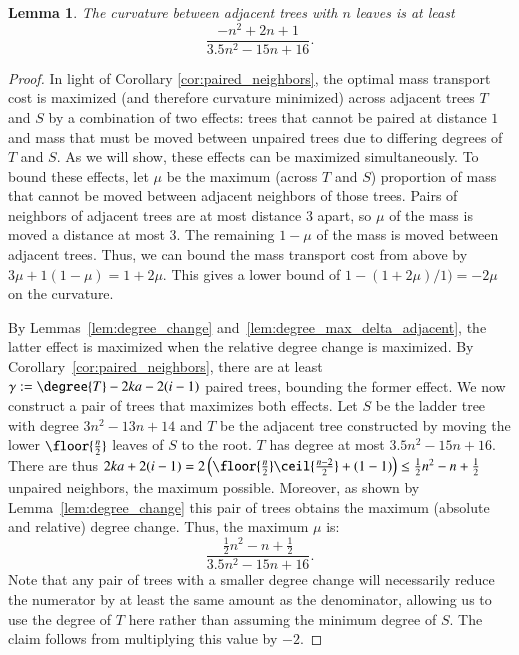 \documentclass[]{elsarticle}
\newtheorem{lem}[thm]{Lemma}
\newcommand{\overlap}{%
	\gamma
}
\begin{document}
\begin{lem}
\label{lem:curvature_lower_bound}
	The curvature between adjacent trees with $n$ leaves is at least
	$$\frac{-n^2 + 2n + 1}{3.5n^2 - 15n + 16}.$$
\end{lem}
\begin{proof}
    In light of Corollary \ref{cor:paired_neighbors}, the optimal mass transport cost is maximized (and therefore curvature minimized) across adjacent trees $T$ and $S$ by a combination of two effects: trees that cannot be paired at distance $1$ and mass that must be moved between unpaired trees due to differing degrees of $T$ and $S$.
		As we will show, these effects can be maximized simultaneously.
    To bound these effects, let $\mu$ be the maximum (across $T$ and $S$) proportion of mass that cannot be moved between adjacent neighbors of those trees.
		Pairs of neighbors of adjacent trees are at most distance 3 apart, so $\mu$ of the mass is moved a distance at most 3.
		The remaining $1-\mu$ of the mass is moved between adjacent trees.
		Thus, we can bound the mass transport cost from above by $3\mu + 1(1-\mu) = 1 + 2\mu$.
	This gives a lower bound of $1 - (1 + 2\mu) / 1) = -2\mu$ on the curvature.

	By Lemmas~\ref{lem:degree_change} and~\ref{lem:degree_max_delta_adjacent}, the latter effect is maximized when the relative degree change is maximized.
	By Corollary~\ref{cor:paired_neighbors}, there are at least $\overlap := \degree{T} -2ka - 2(i-1)$ paired trees, bounding the former effect.
	We now construct a pair of trees that maximizes both effects.
	Let $S$ be the ladder tree with degree $3n^2 - 13n + 14$ and $T$ be the adjacent tree constructed by moving the lower $\floor{\frac{n}{2}}$ leaves of $S$ to the root.
	$T$ has degree at most $3.5n^2 -15n + 16$.
	There are thus $2ka + 2(i-1) = 2\left(\floor{\frac{n}{2}}\ceil{\frac{n-2}{2}} +(1-1)\right) \le \frac{1}{2}n^2 - n + \frac{1}{2}$ unpaired neighbors, the maximum possible.
	Moreover, as shown by Lemma~\ref{lem:degree_change} this pair of trees obtains the maximum (absolute and relative) degree change.
	Thus, the maximum $\mu$ is:
	$$\frac{\frac{1}{2}n^2 - n + \frac{1}{2}}{3.5n^2 - 15n + 16}.$$
	Note that any pair of trees with a smaller degree change will necessarily reduce the numerator by at least the same amount as the denominator, allowing us to use the degree of $T$ here rather than assuming the minimum degree of $S$.
	The claim follows from multiplying this value by $-2$.
\end{proof}
\end{document}
